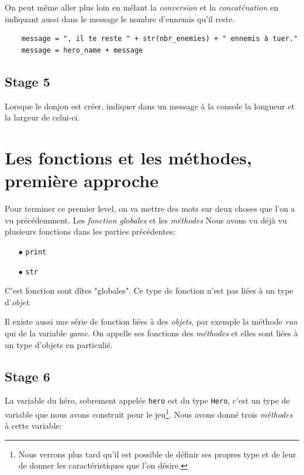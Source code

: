\documentclass[12pt,a4paper]{report}
\newcommand{\codeintext}[1]{\texttt{#1}}
\begin{document}
On peut même aller plus loin en mêlant la \emph{conversion} et la \emph{concaténation} en indiquant aussi dans le message le nombre d'ennemis qu'il reste.

\begin{lstlisting}
	message = ", il te reste " + str(nbr_enemies) + " ennemis à tuer."
	message = hero_name + message
\end{lstlisting}

\subsection{Stage 5}
Lorsque le donjon est créer, indiquer dans un message à la console la longueur et la largeur de celui-ci.

\section{Les fonctions et les méthodes, première approche}

Pour terminer ce premier level, on va mettre des mots sur deux choses que l'on a vu précédemment. Les \emph{fonction globales} et les \emph{méthodes}
Nous avons vu déjà vu plusieurs fonctions dans les parties précédentes:
\begin{itemize}
	\item[$\bullet$] \codeintext{print}
	\item[$\bullet$] \codeintext{str}
\end{itemize}

C'est fonction sont dîtes "globales". Ce type de fonction n'est pas liées à un type d'\emph{objet}.

Il existe aussi une série de fonction liées à des \emph{objets}, par exemple la méthode \emph{run} qui de la variable \emph{game}.
On appelle ses fonctions des \emph{méthodes} et elles sont liées à un type d'objets en particulié.

\subsection{Stage 6}
La variable du héro, sobrement appelée \codeintext{hero} est du type \codeintext{Hero}, c'est un type de variable que nous avons construit pour le jeu\footnote{Nous verrons plus tard qu'il est possible de définir ses propres type et de leur de donner les caractéristiques que l'on désire.}. Nous avons donné trois \emph{méthodes} à cette variable:
\end{document}
